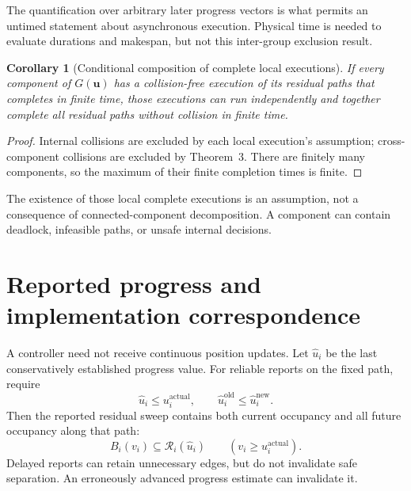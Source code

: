 \documentclass[11pt,a4paper]{article}
\newtheorem{corollary}{Corollary}
\theoremstyle{remark}
\newcommand{\remSweep}{\mathcal R}
\newcommand{\up}{\boldsymbol u}
\begin{document}
The quantification over arbitrary later progress vectors is what permits an
untimed statement about asynchronous execution. Physical time is needed to
evaluate durations and makespan, but not this inter-group exclusion result.

\begin{corollary}[Conditional composition of complete local executions]
If every component of $G(\up)$ has a collision-free execution of its residual
paths that completes in finite time, those executions can run independently
and together complete all residual paths without collision in finite time.
\end{corollary}
\begin{proof}
Internal collisions are excluded by each local execution's assumption;
cross-component collisions are excluded by Theorem~3. There are finitely many
components, so the maximum of their finite completion times is finite.
\end{proof}

The existence of those local complete executions is an assumption, not a
consequence of connected-component decomposition. A component can contain
deadlock, infeasible paths, or unsafe internal decisions.

\section{Reported progress and implementation correspondence}

A controller need not receive continuous position updates. Let $\hat u_i$
be the last conservatively established progress value. For reliable reports
on the fixed path, require
\begin{equation}
 \hat u_i\le u_i^{\mathrm{actual}},\qquad
 \hat u_i^{\mathrm{old}}\le\hat u_i^{\mathrm{new}}.
 \label{eq:reported-progress}
\end{equation}
Then the reported residual sweep contains both current occupancy and all
future occupancy along that path:
\begin{equation}
 B_i(v_i)\subseteq\remSweep_i(\hat u_i)
 \qquad(v_i\ge u_i^{\mathrm{actual}}).
 \label{eq:conservative-report}
\end{equation}
Delayed reports can retain unnecessary edges, but do not invalidate safe
separation. An erroneously advanced progress estimate can invalidate it.
\end{document}

